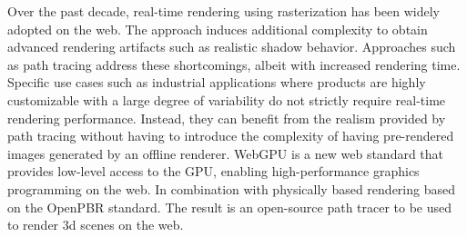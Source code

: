 
Over the past decade, real-time rendering using rasterization has been widely adopted on the web. The approach induces additional complexity to obtain advanced rendering artifacts such as realistic shadow behavior. Approaches such as path tracing address these shortcomings, albeit with increased rendering time. Specific use cases such as industrial applications where products are highly customizable with a large degree of variability do not strictly require real-time rendering performance. Instead, they can benefit from the realism provided by path tracing without having to introduce the complexity of having pre-rendered images generated by an offline renderer. WebGPU is a new web standard that provides low-level access to the GPU, enabling high-performance graphics programming on the web. In combination with physically based rendering based on the OpenPBR standard. The result is an open-source path tracer to be used to render 3d scenes on the web.
